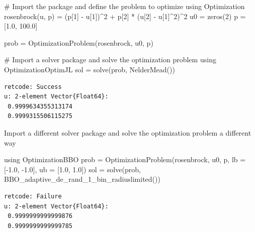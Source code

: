 \documentclass[
  letterpaper,
  DIV=11,
  numbers=noendperiod]{scrreport}
\newenvironment{Shaded}{\begin{snugshade}}{\end{snugshade}}
\newcommand{\BuiltInTok}[1]{\textcolor[rgb]{0.00,0.23,0.31}{#1}}
\newcommand{\CommentTok}[1]{\textcolor[rgb]{0.37,0.37,0.37}{#1}}
\newcommand{\FloatTok}[1]{\textcolor[rgb]{0.68,0.00,0.00}{#1}}
\newcommand{\FunctionTok}[1]{\textcolor[rgb]{0.28,0.35,0.67}{#1}}
\newcommand{\ImportTok}[1]{\textcolor[rgb]{0.00,0.46,0.62}{#1}}
\newcommand{\NormalTok}[1]{\textcolor[rgb]{0.00,0.23,0.31}{#1}}
\newcommand{\OperatorTok}[1]{\textcolor[rgb]{0.37,0.37,0.37}{#1}}
\begin{document}
\begin{Shaded}
\begin{Highlighting}[]
\CommentTok{\# Import the package and define the problem to optimize}
\ImportTok{using} \BuiltInTok{Optimization}
\FunctionTok{rosenbrock}\NormalTok{(u, p) }\OperatorTok{=}\NormalTok{ (p[}\FloatTok{1}\NormalTok{] }\OperatorTok{{-}}\NormalTok{ u[}\FloatTok{1}\NormalTok{])}\OperatorTok{\^{}}\FloatTok{2} \OperatorTok{+}\NormalTok{ p[}\FloatTok{2}\NormalTok{] }\OperatorTok{*}\NormalTok{ (u[}\FloatTok{2}\NormalTok{] }\OperatorTok{{-}}\NormalTok{ u[}\FloatTok{1}\NormalTok{]}\OperatorTok{\^{}}\FloatTok{2}\NormalTok{)}\OperatorTok{\^{}}\FloatTok{2}
\NormalTok{u0 }\OperatorTok{=} \FunctionTok{zeros}\NormalTok{(}\FloatTok{2}\NormalTok{)}
\NormalTok{p }\OperatorTok{=}\NormalTok{ [}\FloatTok{1.0}\NormalTok{, }\FloatTok{100.0}\NormalTok{]}

\NormalTok{prob }\OperatorTok{=} \FunctionTok{OptimizationProblem}\NormalTok{(rosenbrock, u0, p)}

\CommentTok{\# Import a solver package and solve the optimization problem}
\ImportTok{using} \BuiltInTok{OptimizationOptimJL}
\NormalTok{sol }\OperatorTok{=} \FunctionTok{solve}\NormalTok{(prob, }\FunctionTok{NelderMead}\NormalTok{())}
\end{Highlighting}
\end{Shaded}

\begin{verbatim}
retcode: Success
u: 2-element Vector{Float64}:
 0.9999634355313174
 0.9999315506115275
\end{verbatim}

Import a different solver package and solve the optimization problem a
different way

\begin{Shaded}
\begin{Highlighting}[]
\ImportTok{using} \BuiltInTok{OptimizationBBO}
\NormalTok{prob }\OperatorTok{=} \FunctionTok{OptimizationProblem}\NormalTok{(rosenbrock, u0, p, lb }\OperatorTok{=}\NormalTok{ [}\OperatorTok{{-}}\FloatTok{1.0}\NormalTok{, }\OperatorTok{{-}}\FloatTok{1.0}\NormalTok{], ub }\OperatorTok{=}\NormalTok{ [}\FloatTok{1.0}\NormalTok{, }\FloatTok{1.0}\NormalTok{])}
\NormalTok{sol }\OperatorTok{=} \FunctionTok{solve}\NormalTok{(prob, }\FunctionTok{BBO\_adaptive\_de\_rand\_1\_bin\_radiuslimited}\NormalTok{())}
\end{Highlighting}
\end{Shaded}

\begin{verbatim}
retcode: Failure
u: 2-element Vector{Float64}:
 0.9999999999999876
 0.9999999999999785
\end{verbatim}
\end{document}
